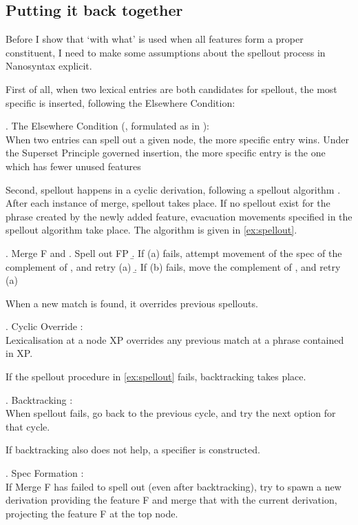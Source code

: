 \documentclass{article}
\begin{document}
\subsection{Putting it back together}

Before I show that  `with what' is used when all features form a proper constituent, I need to make some assumptions about the spellout process in Nanosyntax explicit.

First of all, when two lexical entries are both candidates for spellout, the most specific is inserted, following the Elsewhere Condition:

\ex. The Elsewhere Condition (\citealt{kiparsky1973}, formulated as in \citealt{caha2020}):\\
When two entries can spell out a given node, the more specific entry wins. Under the Superset Principle governed insertion, the more specific entry is the one which has fewer unused features

Second, spellout happens in a cyclic derivation, following a spellout algorithm \citep{starke2018}. After each instance of merge, spellout takes place. If no spellout exist for the phrase created by the newly added feature, evacuation movements specified in the spellout algorithm take place. The algorithm is given in \ref{ex:spellout}.

\ex. Merge F and \label{ex:spellout}
 \a. Spell out FP
 \b. If (a) fails, attempt movement of the spec of the complement of , and retry (a)
 \b. If (b) fails, move the complement of , and retry (a)

When a new match is found, it overrides previous spellouts.

\ex. Cyclic Override \citep{starke2018}:\\
Lexicalisation at a node XP overrides any previous match at a phrase contained in XP.

If the spellout procedure in \ref{ex:spellout} fails, backtracking takes place.

\ex. Backtracking \citep{starke2018}:\\
When spellout fails, go back to the previous cycle, and try the next option for that cycle.

If backtracking also does not help, a specifier is constructed.

\ex. Spec Formation \citep{starke2018}:\\
If Merge F has failed to spell out (even after backtracking), try to spawn a new derivation providing the feature F and merge that with the current derivation, projecting the feature F at the top node.
\end{document}
